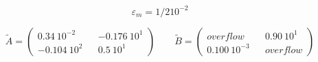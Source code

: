 \[ \varepsilon_m=1/2 10^{-2} \]

\medskip
\[
 \widetilde A=\left(
\begin{array}{ccc}
0.34\ 10^{-2} && -0.176\ 10^1 \\
-0.104\ 10^{2} && 0.5\ 10^{1}
\end{array} \right) \quad \quad
 \widetilde B=\left(
\begin{array}{ccc}
overflow & & 0.90\ 10^1 \\
0.100\ 10^{-3} &  & overflow
\end{array}
\right)
\]

